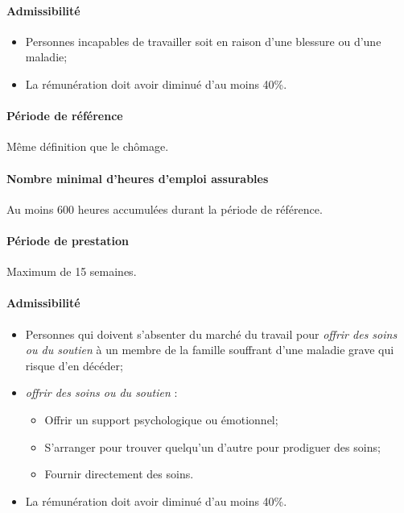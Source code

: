 \documentclass[10pt, french]{article}
\begin{document}
\begin{multicols*}{3}
\begin{definitionNOHFILL}
\paragraph{Admissibilité}
\begin{itemize}[leftmargin = *]
	\item	Personnes incapables de travailler soit en raison d'une blessure ou d'une maladie;
	\item	La rémunération doit avoir diminué d'au moins 40\%.
\end{itemize}

\paragraph{Période de référence}
Même définition que le chômage.

\paragraph{Nombre minimal d'heures d'emploi assurables}
Au moins 600 heures accumulées durant la période de référence.

\paragraph{Période de prestation}
Maximum de 15 semaines.
\end{definitionNOHFILL}

\begin{definitionNOHFILL}
\paragraph{Admissibilité}
\begin{itemize}[leftmargin = *]
	\item	Personnes qui doivent s'absenter du marché du travail pour \og \textit{offrir des soins ou du soutien}\fg{} à un membre de la famille souffrant d'une maladie grave qui risque d'en décéder;
	\item	\og \textit{offrir des soins ou du soutien} \fg{}:
		\begin{itemize}[leftmargin = *]
		\item	Offrir un support psychologique ou émotionnel;
		\item	S'arranger pour trouver quelqu'un d'autre pour prodiguer des soins;
		\item	Fournir directement des soins.
		\end{itemize}
	\item	La rémunération doit avoir diminué d'au moins 40\%.
\end{itemize}


\end{definitionNOHFILL}
\end{multicols*}
\end{document}
